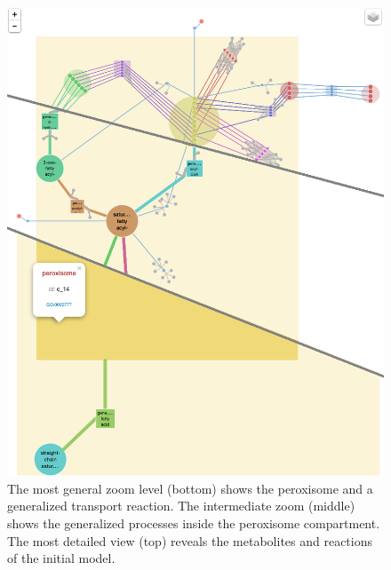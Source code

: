 \documentclass{bmcart}
\begin{document}
\begin{backmatter}
  \begin{figure}[h!]
 \includegraphics[scale=0.41]{figure_main.png}
  \caption{
  \label{fig:zoom_levels}  
      The most general zoom level (bottom) shows the peroxisome and a generalized transport reaction. The intermediate zoom (middle) shows the generalized processes inside the peroxisome compartment. The most detailed view (top) reveals the metabolites and reactions of the initial model.}
      \end{figure}




\end{backmatter}
\end{document}
